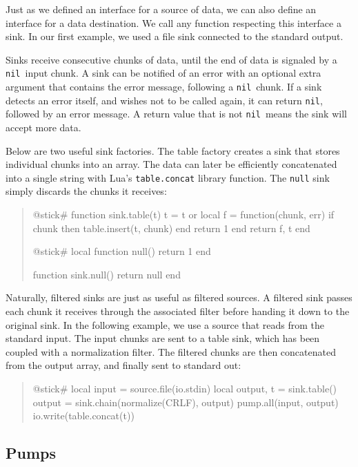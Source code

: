 \documentclass[10pt]{article}
\newcommand{\nil}{\texttt{nil}}
\begin{document}
Just as we defined an interface for a source of data, we can
also define an interface for a data destination.  We call
any function respecting this interface a sink. In our first
example, we used a file sink connected to the standard
output.

Sinks receive consecutive chunks of data, until the end of
data is signaled by a \nil\ input chunk. A sink can be
notified of an error with an optional extra argument that
contains the error message, following a \nil\ chunk.
If a sink detects an error itself, and
wishes not to be called again, it can return \nil,
followed by an error message. A return value that
is not \nil\ means the sink will accept more data.

Below are two useful sink factories.
The table factory creates a sink that stores
individual chunks into an array. The data can later be
efficiently concatenated into a single string with Lua's
\texttt{table.concat} library function. The \texttt{null} sink
simply discards the chunks it receives:
\begin{quote}
\begin{lua}
@stick#
function sink.table(t)
  t = t or {}
  local f = function(chunk, err)
    if chunk then table.insert(t, chunk) end
    return 1
  end
  return f, t
end
%

@stick#
local function null()
  return 1
end

function sink.null()
  return null
end
%
\end{lua}
\end{quote}

Naturally, filtered sinks are just as useful as filtered
sources. A filtered sink passes each chunk it receives
through the associated filter before handing it down to the
original sink.  In the following example, we use a source
that reads from the standard input.  The input chunks are
sent to a table sink, which has been coupled with a
normalization filter.  The filtered chunks are then
concatenated from the output array, and finally sent to
standard out:
\begin{quote}
\begin{lua}
@stick#
local input = source.file(io.stdin)
local output, t = sink.table()
output = sink.chain(normalize(CRLF), output)
pump.all(input, output)
io.write(table.concat(t))
%
\end{lua}
\end{quote}

\subsection{Pumps}
\end{document}
